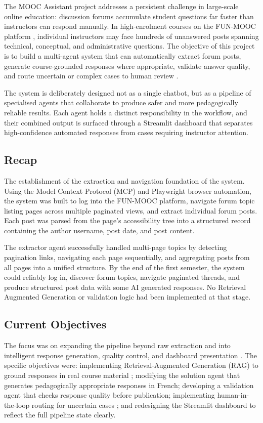 \documentclass[12pt, a4paper]{article}
\begin{document}
The MOOC Assistant project addresses a persistent challenge in large-scale online education: discussion forums accumulate student questions far faster than instructors can respond manually. In high-enrolment courses on the FUN-MOOC platform , individual instructors may face hundreds of unanswered posts spanning technical, conceptual, and administrative questions. The objective of this project is to build a multi-agent system that can automatically extract forum posts, generate course-grounded responses where appropriate, validate answer quality, and route uncertain or complex cases to human review .

The system is deliberately designed not as a single chatbot, but as a pipeline of specialised agents that collaborate to produce safer and more pedagogically reliable results. Each agent holds a distinct responsibility in the workflow, and their combined output is surfaced through a Streamlit dashboard that separates high-confidence automated responses from cases requiring instructor attention.

\subsection{Recap}

The establishment of the extraction and navigation foundation of the system. Using the Model Context Protocol (MCP) and Playwright browser automation, the system was built to log into the FUN-MOOC platform, navigate forum topic listing pages across multiple paginated views, and extract individual forum posts. Each post was parsed from the page's accessibility tree into a structured record containing the author username, post date, and post content.

The extractor agent successfully handled multi-page topics by detecting pagination links, navigating each page sequentially, and aggregating posts from all pages into a unified structure.
By the end of the first semester, the system could reliably log in, discover forum topics, navigate paginated threads, and produce structured post data with some AI generated responses. No Retrieval Augmented Generation or validation logic had been implemented at that stage.

\subsection{Current Objectives}

The focus was on expanding the pipeline beyond raw extraction and into intelligent response generation, quality control, and dashboard presentation \cite{kasneci2023chatgpt}. The specific objectives were: implementing Retrieval-Augmented Generation (RAG) to ground responses in real course material \cite{lewis2020rag}; modifying the solution agent that generates pedagogically appropriate responses in French; developing a validation agent that checks response quality before publication; implementing human-in-the-loop routing for uncertain cases \cite{gaultier2024mcp}; and redesigning the Streamlit dashboard to reflect the full pipeline state clearly.
\end{document}
